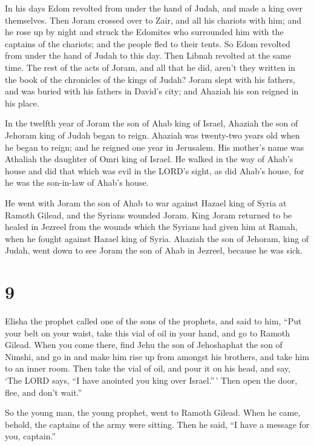  In his days Edom revolted from under the hand of Judah,
and made a king over themselves.  Then Joram crossed over
to Zair, and all his chariots with him; and he rose up by night and
struck the Edomites who surrounded him with the captains of the
chariots; and the people fled to their tents.  So Edom
revolted from under the hand of Judah to this day. Then Libnah revolted
at the same time.  The rest of the acts of Joram, and all
that he did, aren't they written in the book of the chronicles of the
kings of Judah?  Joram slept with his fathers, and was
buried with his fathers in David's city; and Ahaziah his son reigned in
his place.

 In the twelfth year of Joram the son of Ahab king of
Israel, Ahaziah the son of Jehoram king of Judah began to reign.
 Ahaziah was twenty-two years old when he began to reign;
and he reigned one year in Jerusalem. His mother's name was Athaliah the
daughter of Omri king of Israel.  He walked in the way of
Ahab's house and did that which was evil in the LORD's sight, as did
Ahab's house, for he was the son-in-law of Ahab's house.

 He went with Joram the son of Ahab to war against Hazael
king of Syria at Ramoth Gilead, and the Syrians wounded Joram.
 King Joram returned to be healed in Jezreel from the
wounds which the Syrians had given him at Ramah, when he fought against
Hazael king of Syria. Ahaziah the son of Jehoram, king of Judah, went
down to see Joram the son of Ahab in Jezreel, because he was sick.

\hypertarget{section-8}{%
\section{9}\label{section-8}}

 Elisha the prophet called one of the sons of the prophets,
and said to him, ``Put your belt on your waist, take this vial of oil in
your hand, and go to Ramoth Gilead.  When you come there,
find Jehu the son of Jehoshaphat the son of Nimshi, and go in and make
him rise up from amongst his brothers, and take him to an inner room.
 Then take the vial of oil, and pour it on his head, and
say, `The LORD says, ``I have anointed you king over Israel.''\,' Then
open the door, flee, and don't wait.''

 So the young man, the young prophet, went to Ramoth Gilead.
 When he came, behold, the captains of the army were
sitting. Then he said, ``I have a message for you, captain.''

